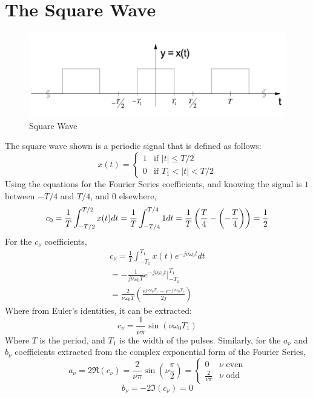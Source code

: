 \section{The Square Wave}
\begin{figure}[H]
    \centering
    \includegraphics[width=0.8\linewidth]{images/square_wave.png}
    \caption{Square Wave}
    \label{fig:square_wave}
\end{figure}
The square wave shown is a periodic signal that is defined as follows:
\begin{equation}
    x(t) = \begin{cases}
        1 & \text{if } |t| \leq T/2    \\
        0 & \text{if } T_1 < |t| < T/2
    \end{cases}
\end{equation}
Using the equations for the Fourier Series coefficients, and knowing the signal is $1$ between $-T/4$ and $T/4$, and $0$ elsewhere,
\begin{equation}
    c_0 = \frac{1}{T}\int_{-T/2}^{T/2}x(t) dt = \frac{1}{T}\int_{-T/4}^{T/4} 1 dt = \frac{1}{T}\left(\frac{T}{4} - \left(-\frac{T}{4}\right)\right) = \frac{1}{2} \\
\end{equation}
For the $c_\nu$ coefficients,
\begin{equation}
    \begin{gathered}
        c_\nu = \frac{1}{T}\int_{-T_1}^{T_1}x(t)e^{-j \nu\omega_0t} dt \\
        = -\frac{1}{j\nu\omega_0T}e^{-j\nu\omega_0t}\Big|_{-T_1}^{T_1} \\
        = \frac{2}{\nu\omega_0T}\left(\frac{e^{j\nu\omega_0T_1} - e^{-j\nu\omega_0T_1}}{2j}\right)
    \end{gathered}
\end{equation}
Where from Euler's identities, it can be extracted:
\begin{equation}
    c_\nu = \frac{1}{\nu\pi}\sin(\nu\omega_0T_1)
\end{equation}
Where $T$ is the period, and $T_1$ is the width of the pulses.
Similarly, for the $a_\nu$ and $b_\nu$ coefficients extracted from the complex exponential form of the Fourier Series,
\begin{equation}
    a_\nu = 2\Re(c_\nu) = \frac{2}{\nu\pi}\sin\left(\nu\frac{\pi}{2}\right) = \begin{cases}
        0                & {\nu \text{ even}} \\
        \frac{2}{\nu\pi} & {\nu \text{ odd}}
    \end{cases}
\end{equation}
\begin{equation}
    b_\nu = -2\Im(c_\nu) = 0
\end{equation}

